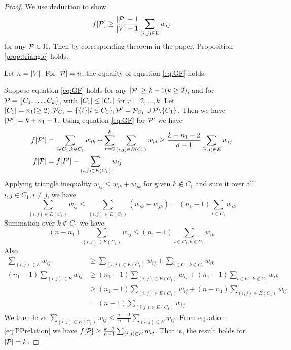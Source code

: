 \documentclass{article}
\begin{document}

\begin{proof}

We use deduction to show  
\begin{equation}\label{eq:GF}
f[\P] \geq \frac{\abs{\P}-1}{\abs{V}-1} \sum_{(i,j) \in E} w_{ij}
\end{equation}
for any $\P \in \Pi$. Then by corresponding theorem in the paper, Proposition \ref{prop:triangle} holds. 

Let $n=\abs{V}$. For $\abs{\P}=n$, the equality of equation \ref{eq:GF} holds. 

Suppose equation \eqref{eq:GF} holds for any $\abs{\P} \geq k+1(k\geq 2)$, and for $\P=\{C_1, \dots, C_k\}$, with $\abs{C_1} \leq \abs{C_r}$ for $r=2,\dots, k$. Let $\abs{C_1}=n_1(\geq 2), \P_{C_1} = \{\{i\}| i \in C_1\}, \P'=\P_{C_1} \cup \P \backslash \{C_1\}$. Then we have $\abs{\P'} = k+n_1-1$. Using equation \eqref{eq:GF} for $\P'$ we have
\begin{align}\label{eq:PPrelation}
f[\P'] & = \sum_{i\in C_1, k \not\in C_1} w_{ik} + \sum_{r=2}^k \sum_{(i,j) \in E(C_r)} w_{ij}\geq \frac{k+n_1 -2}{n-1}\sum_{(i,j) \in E} w_{ij} \\
f[\P] & =f[P'] - \sum_{(i,j) \in E(C_1)} w_{ij}
\end{align}
Applying triangle inequality $w_{ij} \leq w_{ik} + w_{jk}$ for given $k\not\in C_1$ and sum it over all $i, j \in C_1, i\neq j$, we have
$$
\sum_{(i,j) \in E(C_1)} w_{ij} \leq \sum_{(i,j) \in E(C_1)} (w_{ik} + w_{jk}) = (n_1-1)\sum_{i\in C_1} w_{ik}
$$
Summation over $k \not\in C_1$ we have 
$$
(n - n_1) \sum_{(i,j) \in E(C_1)} w_{ij} \leq (n_1 - 1) \sum_{i \in C_1, k \not\in C_1} w_{ik}
$$
Also
\begin{align*}
\sum_{(i,j) \in E} w_{ij}  & \geq \sum_{(i,j) \in E(C_1)} w_{ij} + \sum_{i\in C_1, k\not\in C_1} w_{ik} \\
(n_1 - 1)\sum_{(i,j) \in E} w_{ij}  & \geq (n_1 -1 )\sum_{(i,j) \in E(C_1)} w_{ij} + (n_1-1)\sum_{i\in C_1, k\not\in C_1} w_{ik} \\
& \geq (n_1 -1 )\sum_{(i,j) \in E(C_1)} w_{ij} + (n - n_1) \sum_{(i,j) \in E(C_1)} w_{ij}\\
& = (n-1) \sum_{(i,j) \in E(C_1)} w_{ij}
\end{align*}
We then have $\sum_{(i,j) \in E(C_1)} w_{ij} \leq \frac{n_1-1}{n-1}\sum_{(i,j) \in E} w_{ij}$. From equation \eqref{eq:PPrelation} we have 
$f[\P] \geq \frac{k-1}{n-1}\sum_{(i,j) \in E} w_{ij}$. That is, the result holds for $\abs{\P}=k$.
\end{proof}
\end{document}
